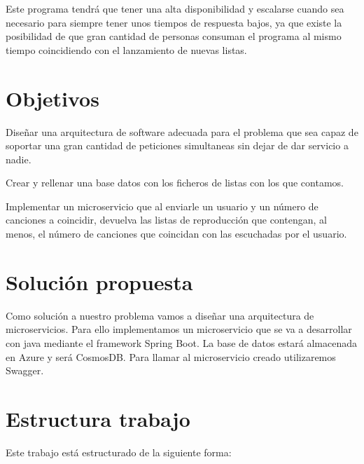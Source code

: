 \documentclass[12pt]{report} %
\begin{document}
	Este programa tendrá que tener una alta disponibilidad y escalarse cuando sea necesario para siempre tener unos tiempos de respuesta bajos, ya que existe la posibilidad de que gran cantidad de personas consuman el programa al mismo tiempo coincidiendo con el lanzamiento de nuevas listas.
	
	\section{Objetivos}
		
	Diseñar una arquitectura de software adecuada para el problema que sea capaz de soportar una gran cantidad de peticiones simultaneas sin dejar de dar servicio a nadie.
	
	Crear y rellenar una base datos con los ficheros de listas con los que contamos.
	
	Implementar un microservicio que al enviarle un usuario y un número de canciones a coincidir, devuelva las listas de reproducción que contengan, al menos, el número de canciones que coincidan con las escuchadas por el usuario.
	
	
	\section{Solución propuesta}
	Como solución a nuestro problema vamos a diseñar una arquitectura de microservicios.
	Para ello implementamos un microservicio que se va a desarrollar con java mediante el framework Spring Boot.
	La base de datos estará almacenada en Azure y será CosmosDB.
	Para llamar al microservicio creado utilizaremos Swagger.
	
	\section{Estructura trabajo}
	Este trabajo está estructurado de la siguiente forma:
	
\end{document}

